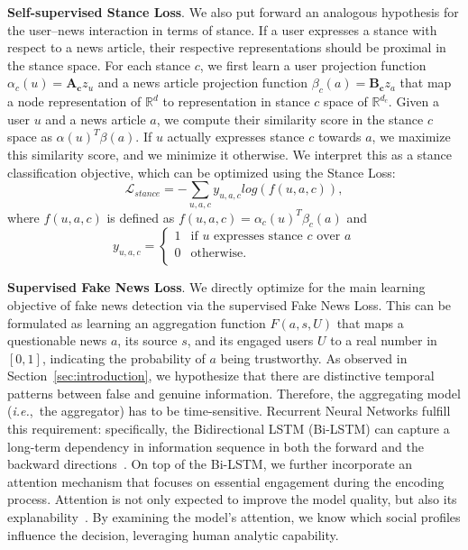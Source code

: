 \documentclass[sigconf,anonymous]{acmart}
\theoremstyle{definition}
\theoremstyle{hypothesis}
\begin{document}
\textbf{Self-supervised Stance Loss}.
We also put forward an analogous hypothesis for the user--news interaction in terms of stance. If a user expresses a stance with respect to a news article, their respective representations should be proximal
in the stance space. For each stance $c$, we first learn a user projection function $\alpha_c(u) = \mathbf{A_c} z_u$ and a news article projection function $\beta_c(a) = \mathbf{B_c} z_a$ that map a node representation of $\mathbb{R}^d$ to representation in stance $c$ space of $\mathbb{R}^{d_c}$. Given a user $u$ and a news article $a$, we compute their similarity score in the stance $c$ space as $\alpha(u)^T \beta(a)$. If $u$ actually expresses stance $c$ towards $a$, we maximize this similarity score, and we minimize it otherwise. We interpret this as a stance classification objective, which can be optimized using the Stance Loss: 
\begin{equation}
    \mathcal{L}_{stance} = -\sum_{u,a,c} y_{u,a,c} log(f(u,a,c)), 
\end{equation}
where $f(u,a,c)$ is defined as $f(u,a,c) = \alpha_c(u)^T \beta_c(a)$ and
\[  y_{u,a,c} = \left\{
\begin{array}{ll}
      1 & \textrm{if } u \textrm{ expresses stance } c \textrm{ over } a \\
      0 & \textrm{otherwise}. \\
\end{array} 
\right. \]

\textbf{Supervised Fake News Loss}. We directly optimize for the main learning objective of fake news detection via the supervised Fake News Loss. This can be formulated as learning an aggregation function $F(a, s, U)$ that maps a questionable news $a$, its source $s$, and its engaged users $U$ to a real number in $[0, 1]$, indicating the probability of $a$ being trustworthy. As observed in Section~\ref{sec:introduction}, we hypothesize that there are distinctive temporal patterns between false and genuine information. Therefore, the aggregating model (\textit{i.e.},~the aggregator) has to be time-sensitive.
Recurrent Neural Networks fulfill this requirement: specifically, the Bidirectional LSTM (Bi-LSTM) can capture a long-term dependency in information sequence in both the forward and the backward directions~\cite{lstm1997hochreiter}. On top of the Bi-LSTM, we further incorporate an attention mechanism that focuses on essential engagement during the encoding process. Attention is not only expected to improve the model quality, but also its explanability~\cite{luong2015effective,vaswani2017attention}. By examining the model's attention, we know which social profiles influence the decision, leveraging human analytic capability. 
\end{document}

